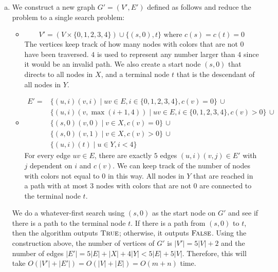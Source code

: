 \documentclass[11pt]{article}
\begin{document}



\begin{solution}
\begin{enumerate}[(a)]
\item We construct a new graph $G'=(V', E')$ defined as follows and reduce the problem to a single search problem:
\begin{itemize}
\item
$$V'=(V\times\{0,1,2,3,4\})\cup\{(s, 0), t\}\text{ where $c(s)=c(t)=0$}$$
The vertices keep track of how many nodes with colors that are not $0$ have been traversed. $4$ is used to represent any number larger than $4$ since it would be an invalid path. We also create a start node $(s,0)$ that directs to all nodes in $X$, and a terminal node $t$ that is the descendant of all nodes in $Y$.
\item 
\begin{align*}
	E' =&\{(u,i)(v,i)\mid uv\in E, i\in\{0,1,2,3,4\}, c(v)=0\}\,\cup
\\	&\{(u,i)(v,\max(i+1,4))\mid uv\in E, i\in\{0,1,2,3,4\}, c(v)>0\}\,\cup
\\	&\{(s,0)(v,0)\mid v\in X, c(v)=0\}\,\cup
\\	&\{(s,0)(v,1)\mid v\in X, c(v)>0\}\,\cup
\\	&\{(u,i)(t)\mid u\in Y, i<4\}
\end{align*}
For every edge $uv\in E$, there are exactly $5$ edges $(u,i)(v,j)\in E'$ with $j$ dependent on $i$ and $c(v)$. We can keep track of the number of nodes with colors not equal to $0$ in this way. All nodes in $Y$ that are reached in a path with at most $3$ nodes with colors that are not $0$ are connected to the terminal node $t$.
\end{itemize}
We do a whatever-first search using $(s,0)$ as the start node on $G'$ and see if there is a path to the terminal node $t$. If there is a path from $(s,0)$ to $t$, then the algorithm outputs $\textsc{True}$; otherwise, it outputs $\textsc{False}$. Using the construction above, the number of vertices of $G'$ is $|V'|=5|V|+2$ and the number of edges $|E'|=5|E|+|X|+4|Y|<5|E|+5|V|$. Therefore, this will take $O(|V'|+|E'|)=O(|V|+|E|)=O(m+n)$ time.


\end{enumerate}
\end{solution}
\end{document}
